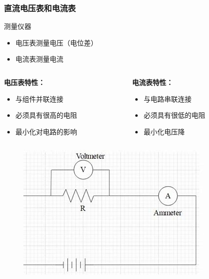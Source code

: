 \documentclass{beamer}
\begin{document}
\begin{frame}
    \frametitle{直流电压表和电流表}
    \begin{block}{测量仪器}
        \begin{itemize}
            \item 电压表测量电压（电位差）
            \item 电流表测量电流
        \end{itemize}
    \end{block}
    \begin{columns}
        \begin{column}{0.5\textwidth}
            \textbf{电压表特性：}
            \begin{itemize}
                \item 与组件并联连接
                \item 必须具有很高的电阻
                \item 最小化对电路的影响
            \end{itemize}
        \end{column}
        \begin{column}{0.5\textwidth}
            \textbf{电流表特性：}
            \begin{itemize}
                \item 与电路串联连接
                \item 必须具有很低的电阻
                \item 最小化电压降
            \end{itemize}
        \end{column}
    \end{columns}
    \begin{figure}
        \centering
        \includegraphics[width=0.3\linewidth]{phys12-circuits-ammeter-voltmeter-connection.jpg}
    \end{figure}
\end{frame}
\end{document}
